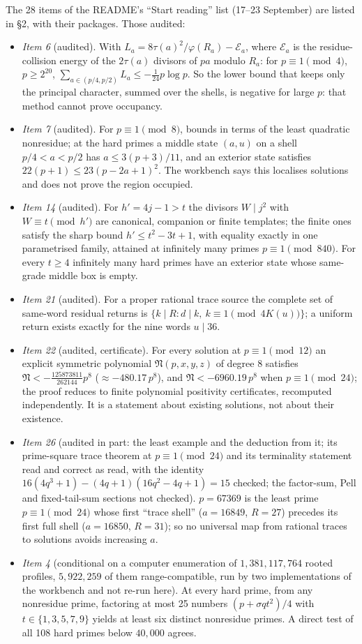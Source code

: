 The 28 items of the README's ``Start reading'' list (17--23 September) are listed in  §2, with their packages. Those audited:
\begin{itemize}
\item \emph{Item 6} (audited). With $L_a=8\tau(a)^2/\varphi(R_a)-\mathcal E_a$, where $\mathcal E_a$ is the residue-collision energy of the $2\tau(a)$ divisors of $pa$ modulo $R_a$: for $p\equiv1\pmod4$, $p\ge2^{20}$, $\sum_{a\in(p/4,p/2)}L_a\le-\tfrac1{24}p\log p$. So the lower bound that keeps only the principal character, summed over the shells, is negative for large $p$: that method cannot prove occupancy.
\item \emph{Item 7} (audited). For $p\equiv1\pmod 8$, bounds in terms of the least quadratic nonresidue; at the hard primes a middle state $(a,u)$ on a shell $p/4<a<p/2$ has $a\le3(p+3)/11$, and an exterior state satisfies $22(p+1)\le23(p-2a+1)^2$. The workbench says this localises solutions and does not prove the region occupied.
\item \emph{Item 14} (audited). For $h'=4j-1>t$ the divisors $W\mid j^2$ with $W\equiv t\pmod{h'}$ are canonical, companion or finite templates; the finite ones satisfy the sharp bound $h'\le t^2-3t+1$, with equality exactly in one parametrised family, attained at infinitely many primes $p\equiv1\pmod{840}$. For every $t\ge4$ infinitely many hard primes have an exterior state whose same-grade middle box is empty.
\item \emph{Item 21} (audited). For a proper rational trace source the complete set of same-word residual returns is $\{k\mid R: d\mid k,\ k\equiv1\pmod{4K(u)}\}$; a uniform return exists exactly for the nine words $u\mid36$.
\item \emph{Item 22} (audited, certificate). For every solution at $p\equiv1\pmod{12}$ an explicit symmetric polynomial $\mathfrak N(p,x,y,z)$ of degree $8$ satisfies $\mathfrak N<-\frac{125873811}{262144}p^8$ ($\approx-480.17\,p^8$), and $\mathfrak N<-6960.19\,p^8$ when $p\equiv1\pmod{24}$; the proof reduces to finite polynomial positivity certificates, recomputed independently. It is a statement about existing solutions, not about their existence.
\item \emph{Item 26} (audited in part: the least example and the deduction from it; its prime-square trace theorem at $p\equiv1\pmod{24}$ and its terminality statement read and correct as read, with the identity $16(4q^3+1)-(4q+1)(16q^2-4q+1)=15$ checked; the factor-sum, Pell and fixed-tail-sum sections not checked). $p=67369$ is the least prime $p\equiv1\pmod{24}$ whose first ``trace shell'' ($a=16849$, $R=27$) precedes its first full shell ($a=16850$, $R=31$); so no universal map from rational traces to solutions avoids increasing $a$.
\item \emph{Item 4} (conditional on a computer enumeration of $1{,}381{,}117{,}764$ rooted profiles, $5{,}922{,}259$ of them range-compatible, run by two implementations of the workbench and not re-run here). At every hard prime, from any nonresidue prime, factoring at most 25 numbers $(p+\sigma qt^2)/4$ with $t\in\{1,3,5,7,9\}$ yields at least six distinct nonresidue primes. A direct test of all 108 hard primes below $40{,}000$ agrees.
\end{itemize}
